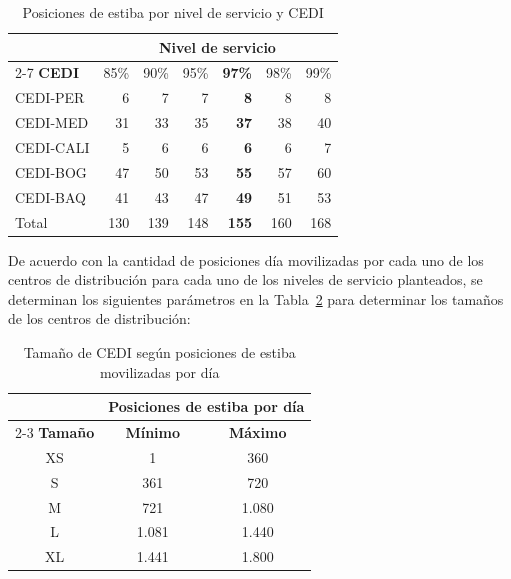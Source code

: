 \documentclass[fleqn, 11pt,letterpaper]{article}
\begin{document}
\begin{table}[H]
\centering
\caption{Posiciones de estiba por nivel de servicio y CEDI}

\label{tab:posiciones_nivel_servicio}
\renewcommand{\arraystretch}{1.2}
\begin{tabular}{l *{6}{r}}
\toprule
 & \multicolumn{6}{c}{\textbf{Nivel de servicio}} \\
\cmidrule(lr){2-7}
\textbf{CEDI} & 85\% & 90\% & 95\% & \textbf{97\%} & 98\% & 99\% \\
\midrule
CEDI-PER  &  6 &  7 &  7 & \textbf{8}  &  8 &  8 \\
CEDI-MED  & 31 & 33 & 35 & \textbf{37} & 38 & 40 \\
CEDI-CALI &  5 &  6 &  6 & \textbf{6}  &  6 &  7 \\
CEDI-BOG  & 47 & 50 & 53 & \textbf{55} & 57 & 60 \\
CEDI-BAQ  & 41 & 43 & 47 & \textbf{49} & 51 & 53 \\
\midrule
Total & 130 & 139 & 148 & \textbf{155} & 160 & 168 \\
\bottomrule
\end{tabular}
\end{table}

De acuerdo con la cantidad de posiciones día movilizadas por cada uno de los centros de distribución para cada uno de los niveles de servicio planteados, se determinan los siguientes parámetros en la Tabla~\ref{tab:tamano_cedi}  para determinar los tamaños de los centros de distribución:

\begin{table}[H]
\centering
\caption{Tamaño de CEDI según posiciones de estiba movilizadas por día}
\label{tab:tamano_cedi}
\renewcommand{\arraystretch}{1.2}
\begin{tabular}{ccc}
\toprule
 & \multicolumn{2}{c}{\textbf{Posiciones de estiba por día}} \\
\cmidrule(lr){2-3}
\textbf{Tamaño} & \textbf{Mínimo} & \textbf{Máximo} \\
\midrule
XS & 1    & 360  \\
S  & 361  & 720  \\
M  & 721  & 1.080 \\
L  & 1.081 & 1.440 \\
XL & 1.441 & 1.800 \\
\bottomrule
\end{tabular}
\end{table}
\end{document}
